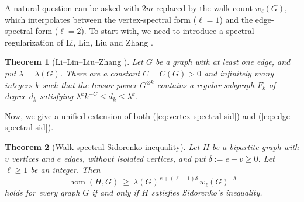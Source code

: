 \documentclass[11pt, a4paper]{article}
\newtheorem{theorem}{Theorem}[section]
\theoremstyle{definition}
\theoremstyle{plain}
\renewcommand{\le}{\leqslant}
\renewcommand{\ge}{\geqslant}
\begin{document}
\smallskip 
A natural question can be asked with
$2m$ replaced by the walk count $w_\ell (G)$,
which interpolates between the vertex-spectral
form ($\ell =1$) and the
edge-spectral form ($\ell =2$). 
To start with, we need to introduce a spectral
regularization of Li, Lin, Liu and Zhang \cite[Theorem 1.2]{LLLZ-Sidorenko}.

\begin{theorem}[Li--Lin--Liu--Zhang \cite{LLLZ-Sidorenko}]
\label{lem:spectral-regularization}
Let $G$ be a graph with at least one edge, and put
$\lambda =\lambda (G)$. There are a constant
$C=C(G)>0$ and infinitely many integers $k$ such
that the tensor power $G^{\otimes k}$ contains a
regular subgraph $F_k$ of degree $d_k$ satisfying 
$\lambda^{k}k^{-C}\le d_k\le \lambda^{k}$. 
\end{theorem}

Now, we give a unified extension of both (\ref{eq:vertex-spectral-sid}) and (\ref{eq:edge-spectral-sid}). 

\begin{theorem}[Walk-spectral Sidorenko inequality]
\label{thm:walk-sidorenko}
Let $H$ be a bipartite graph with $v$ vertices and
$e$ edges, without isolated vertices, and put 
$\delta :=e-v\ge 0$. Let $\ell \ge 1$ be an integer. Then
\begin{equation}\label{eq:walk-sidorenko}
  \hom (H,G)\ \ge\
  \lambda (G)^{\,e+(\ell -1)\delta}\,
  w_\ell (G)^{-\delta} 
\end{equation}
holds for every graph $G$ 
 if and only if $H$ satisfies Sidorenko's
inequality.
\end{theorem}
\end{document}
